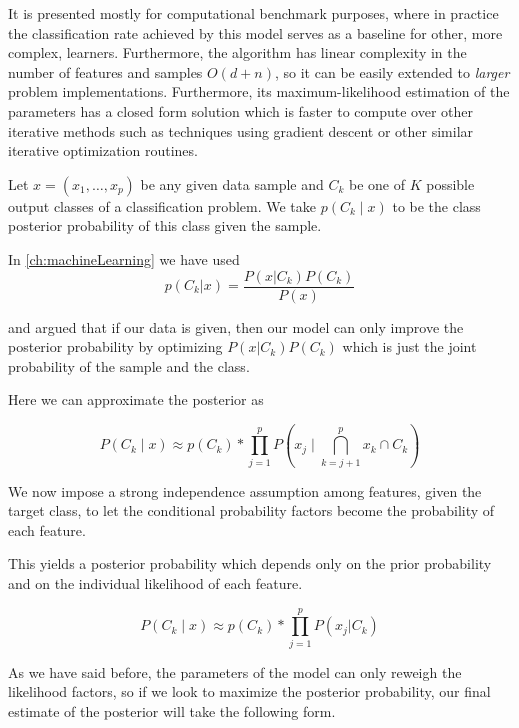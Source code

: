 It is presented mostly for computational benchmark purposes, where in practice the classification rate achieved by this model serves as a baseline for other, more complex, learners. Furthermore, the algorithm has linear complexity in the number of features and samples $O(d+n)$, so it can be easily extended to \textit{larger} problem implementations. Furthermore, its maximum-likelihood estimation of the parameters has a closed form solution which is faster to compute over other iterative methods such as techniques using gradient descent or other similar iterative optimization routines.

Let $x = (x_1,\ldots,x_p)$ be any given data sample and $C_k$ be one of $K$ possible output classes of a classification problem. We take $p(C_k \mid x)$ to be the class posterior probability of this class given the sample.

In \cref{ch:machineLearning}
we have used
\begin{equation}
p(C_k| x) = \frac{P(x|C_k)P(C_k)}{P(x)}
\end{equation}\label{eq:equation-posteriorProbabilties}


and argued that if our data is given, then our model can only improve the posterior probability by optimizing $P(x|C_k)P(C_k)$ which is just the joint probability of the sample and the class.

Here we can approximate the posterior as

\begin{equation}
P(C_k \mid x) \approx p(C_k) * \prod_{j=1}^{p}  P(x_j \mid \bigcap_{k=j+1}^{p} x_k \cap C_k)
\end{equation}\label{eq:posteriorProbabilityDecomposition1}


We now impose a strong independence assumption among features, given the target class, to let the conditional probability factors become the probability of each feature. %

This yields a posterior probability which depends only on the prior probability and on the individual likelihood of each feature.

\begin{equation}
P(C_k \mid x) \approx p(C_k) * \prod_{j=1}^{p}  P(x_j | C_k)
\end{equation}\label{eq:posteriorProbabilityDecomposition2}

As we have said before, the parameters of the model can only reweigh the likelihood factors, so if we look to maximize the posterior probability, our final estimate of the posterior will take the following form.

